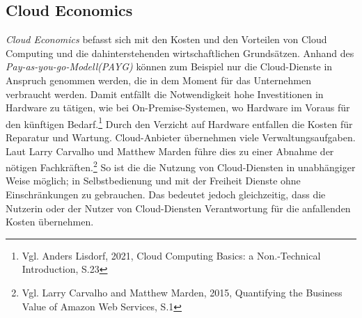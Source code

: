 \subsection{Cloud Economics}\label{subsec_UabsGrund3}
\begin{flushleft}
\textit{Cloud Economics} befasst sich mit den Kosten und den Vorteilen von Cloud Computing und die dahinterstehenden wirtschaftlichen Grundsätzen. Anhand des \textit{Pay-as-you-go-Modell(PAYG)} können zum Beispiel nur die Cloud-Dienste in Anspruch genommen werden, die in dem Moment für das Unternehmen verbraucht werden. Damit entfällt die Notwendigkeit hohe Investitionen in Hardware zu tätigen, wie bei On-Premise-Systemen, wo Hardware im Voraus für den künftigen Bedarf.\footnote{Vgl. Anders Lisdorf, 2021, Cloud Computing Basics: a Non.-Technical Introduction, S.23\cite{CCB}} Durch den Verzicht auf Hardware entfallen die Kosten für Reparatur und Wartung. Cloud-Anbieter übernehmen viele Verwaltungsaufgaben. Laut Larry Carvalho und Matthew Marden führe dies zu einer Abnahme der nötigen Fachkräften.\footnote{Vgl. Larry Carvalho and Matthew Marden, 2015, Quantifying the Business Value of Amazon Web Services, S.1\cite{IDC01}} So ist die die Nutzung von Cloud-Diensten in unabhängiger Weise möglich; in Selbstbedienung und mit der Freiheit Dienste ohne Einschränkungen zu gebrauchen. Das bedeutet jedoch gleichzeitig, dass die Nutzerin oder der Nutzer von Cloud-Diensten Verantwortung für die anfallenden Kosten übernehmen.
\end{flushleft}

